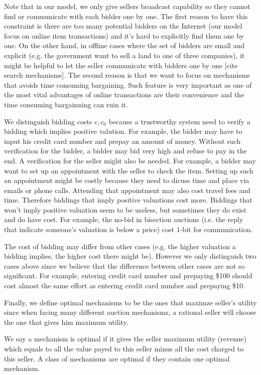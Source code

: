 Note that in our model, we only give sellers broadcast capability so they
cannot find or communicate with each bidder one by one. The first reason to
have this constraint is there are too many potential bidders on the Internet
(our model focus on online item transactions) and it's hard to explicitly find
them one by one. On the other hand, in offline cases where the set of bidders
are small and explicit (e.g. the government want to sell a land to one of three
companies), it might be helpful to let the seller communicate with bidders one
by one [cite search mechanisms]. The second reason is that we want to focus on
mechanisms that avoids time consuming bargaining. Such feature is very
important as one of the most vital advantages of online transactions are their
convenience and the time consuming bargainning can ruin it.

We distinguish bidding costs $c, c_0$ because a trustworthy system need to
verify a bidding which implies positive valution. For example, the bidder may
have to input his credit card number and prepay an amount of money. Without
such verification for the bidder, a bidder may bid very high and refuse to pay
in the end. A verification for the seller might also be needed. For example, a
bidder may want to set up an appointment with the seller to check the item.
Setting up such an appointment might be costly because they need to dicuss time
and place via emails or phone calls.  Attending that appointment may also cost
travel fees and time. Therefore biddings that imply positive valuations cost
more. Biddings that won't imply positive valuation seem to be useless, but
sometimes they do exist and do have cost. For example, the no-bid in bisection
auctions (i.e. the reply that indicate someone's valuation is below a price)
cost $1$-bit for communication.

The cost of bidding may differ from other cases (e.g. the higher valuation a
bidding implies, the higher cost there might be). However we only distinguish
two cases above since we believe that the difference between other cases are
not so significant. For example, entering credit card number and prepaying
\$100 should cost almost the same effort as entering credit card number and
prepaying \$10.

Finally, we define optimal mechanisms to be the ones that maximze seller's
utility since when facing many different auction mechanisms, a rational seller
will choose the one that gives him maximum utility.

\begin{definition}

We say a mechanism is optimal if it gives the seller maximum utility (revenue)
which equals to all the value payed to this seller minus all the cost charged
to this seller. A class of mechanisms are optimal if they contain one optimal
mechanism.

\end{definition}

